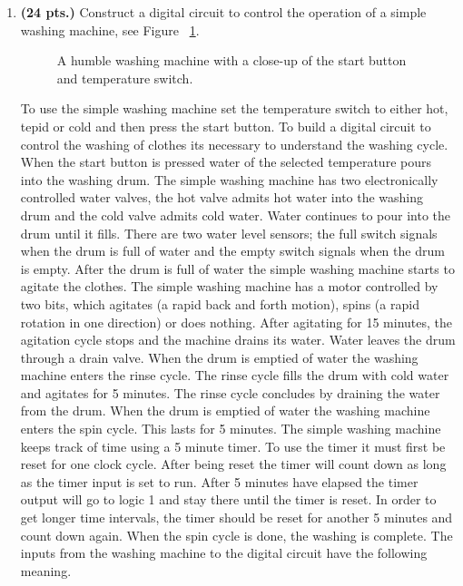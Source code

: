 \begin{enumerate}
\begin{onlysolution}
{One could easily derive the MIEs and OEs for the FSM.
} \end{onlysolution} 

\item \textbf{ (24 pts.)}
Construct a digital circuit to control the operation of a
simple washing machine, see Figure ~\ref{fig:Wash}.
\begin{figure}[ht]
\caption{A humble washing machine with a close-up of the start
button and temperature switch.}
\label{fig:Wash}
\end{figure}
To use the simple washing machine set the temperature switch to 
either hot, tepid or cold and then press the start button.
To build a digital circuit to control the washing of clothes
its necessary to understand the washing cycle.  When the start
button is pressed water of the selected temperature pours 
into the washing drum.  The simple washing machine has two 
electronically controlled water valves, the hot valve admits 
hot water into the washing drum and the cold valve admits 
cold water.  Water continues to pour into the drum until it
fills.  There are two water level sensors; the full switch signals when 
the drum is full of water and the empty switch signals when the drum
is empty.  After the drum is full of water the simple washing machine
starts to agitate the clothes.  The simple washing machine has a motor 
controlled by two bits, which agitates (a rapid back and forth motion), 
spins (a rapid rotation in one direction) or does nothing.  After 
agitating for 15 minutes, the agitation cycle stops and
the machine drains its water.  Water leaves the drum through
a drain valve.  When the drum is emptied of water the washing machine enters
the rinse cycle.   The rinse cycle fills the drum with cold
water and agitates for 5 minutes.  The rinse cycle concludes
by draining the water from the drum.
When the drum is emptied of water the washing machine enters
the spin cycle.  This lasts for 5 minutes.  The simple washing machine 
keeps track of time  using a 5 minute timer.   To use the timer 
it must first be reset for one clock cycle.  After being reset the 
timer will count down as long as the timer input is set to run.  
After 5 minutes have elapsed the timer output will go to logic 1 and 
stay there until the timer is reset.  In order to get longer time
intervals, the timer should be reset for another 5 minutes and count 
down again.  When the spin cycle is done, the washing is complete. The 
inputs from the washing machine to the digital circuit have the 
following meaning.


\end{enumerate}
